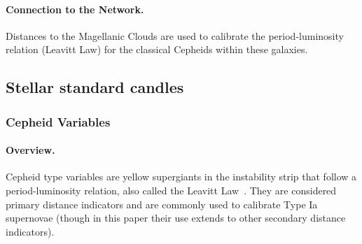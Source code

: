 \paragraph{Connection to the Network.}
Distances to the Magellanic Clouds are used to calibrate the period-luminosity relation (Leavitt Law) for the classical Cepheids within these galaxies. 

\subsection{Stellar standard candles}

\subsubsection{Cepheid Variables}\label{ssec:cepheid}

\paragraph{Overview.}
Cepheid type variables are yellow supergiants in the instability strip that follow a period-luminosity relation, also called the Leavitt Law~\citep{1912HarCi.173....1L}. They are considered primary distance indicators and are commonly used to calibrate Type Ia supernovae (though in this paper their use extends to other secondary distance indicators).

